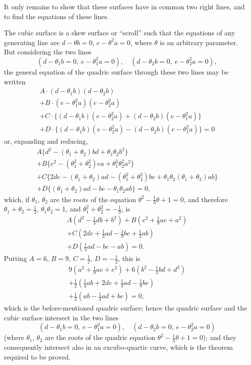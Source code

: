 \documentclass[11pt,a4paper]{article}
\begin{document}
It only remains to show that these surfaces have in common two right lines, and to find the equations of these lines.

The cubic surface is a skew surface or ``scroll'' such that the equations of any generating line are $d - \theta b = 0$, $e - \theta^2 a = 0$, where $\theta$ is an arbitrary parameter. But considering the two lines
\[
(d - \theta_1 b = 0,\ e - \theta_1^2 a = 0), \quad (d - \theta_2 b = 0,\ e - \theta_2^2 a = 0),
\]
the general equation of the quadric surface through these two lines may be written
\begin{multline*}
A \cdot (d-\theta_1 b)(d-\theta_2 b) \\
+ B \cdot (e-\theta_1^2 a)(e-\theta_2^2 a) \\
+ C \cdot \{(d-\theta_1 b)(e-\theta_2^2 a) + (d-\theta_2 b)(e-\theta_1^2 a)\} \\
+ D \cdot \{(d-\theta_1 b)(e-\theta_2^2 a) - (d-\theta_2 b)(e-\theta_1^2 a)\} = 0
\end{multline*}
or, expanding and reducing,
\begin{multline*}
A\{d^2 - (\theta_1+\theta_2)bd + \theta_1\theta_2 b^2\} \\
+ B\{e^2 - (\theta_1^2+\theta_2^2)ea + \theta_1^2\theta_2^2 a^2\} \\
+ C\{2de - (\theta_1+\theta_2)ad - (\theta_1^2+\theta_2^2)be + \theta_1\theta_2(\theta_1+\theta_2)ab\} \\
+ D\{(\theta_1+\theta_2)ad - be - \theta_1\theta_2 ab\} = 0,
\end{multline*}
which, if $\theta_1$, $\theta_2$ are the roots of the equation $\theta^2 - \tfrac{1}{3}\theta + 1 = 0$, and therefore $\theta_1 + \theta_2 = \tfrac{1}{3}$, $\theta_1\theta_2 = 1$, and $\theta_1^2 + \theta_2^2 = -\tfrac{1}{9}$, is
\begin{multline*}
A(d^2 - \tfrac{1}{3}db + b^2) + B(e^2 + \tfrac{1}{9}ae + a^2) \\
+ C(2de + \tfrac{1}{3}ad - \tfrac{1}{9}be + \tfrac{1}{3}ab) \\
+ D(\tfrac{1}{3}ad - be - ab) = 0.
\end{multline*}
Putting $A=6$, $B=9$, $C=\tfrac{1}{2}$, $D=-\tfrac{1}{2}$, this is
\begin{multline*}
9(a^2 + \tfrac{1}{9}ae + e^2) + 6(b^2 - \tfrac{1}{3}bd + d^2) \\
+ \tfrac{1}{2}(\tfrac{1}{3}ab + 2de + \tfrac{1}{3}ad - \tfrac{1}{9}be) \\
+ \tfrac{1}{2}(ab - \tfrac{1}{3}ad + be) = 0,
\end{multline*}
which is the before-mentioned quadric surface; hence the quadric surface and the cubic surface intersect in the two lines
\[
(d - \theta_1 b = 0,\ e - \theta_1^2 a = 0), \quad (d - \theta_2 b = 0,\ e - \theta_2^2 a = 0)
\]
(where $\theta_1$, $\theta_2$ are the roots of the quadric equation $\theta^2 - \tfrac{1}{3}\theta + 1 = 0$); and they consequently intersect also in an excubo-quartic curve, which is the theorem required to be proved.
\end{document}
